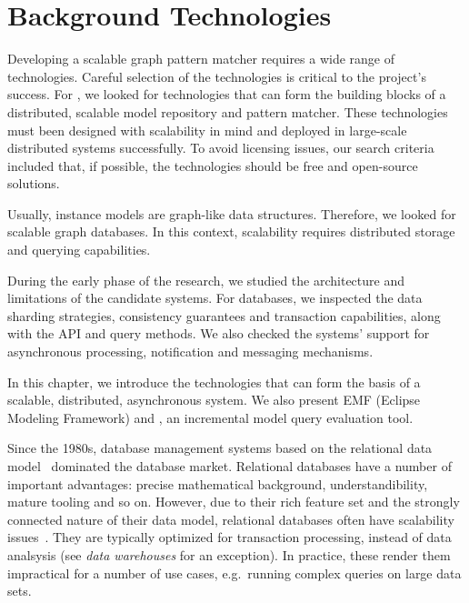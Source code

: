 \chapter{Background Technologies}
\label{chap:background-technologies}

Developing a scalable graph pattern matcher requires a wide range of technologies. Careful selection of the technologies is critical to the project's success. For \iqd{}, we looked for technologies that can form the building blocks of a distributed, scalable model repository and pattern matcher. These technologies must been designed with scalability in mind and deployed in large-scale distributed systems successfully. To avoid licensing issues, our search criteria included that, if possible, the technologies should be free and open-source solutions.

Usually, instance models are graph-like data structures. Therefore, we looked for scalable graph databases. In this context, scalability requires distributed storage and querying capabilities.

During the early phase of the research, we studied the architecture and limitations of the candidate systems. For databases, we inspected the data sharding strategies, consistency guarantees and transaction capabilities, along with the API and query methods. We also checked the systems' support for asynchronous processing, notification and messaging mechanisms.
 
In this chapter, we introduce the technologies that can form the basis of a scalable, distributed, asynchronous system. We also present EMF (Eclipse Modeling Framework) and \eiq{}, an incremental model query evaluation tool.



Since the 1980s, database management systems based on the relational data model~\cite{Codd:1970:RMD:362384.362685} dominated the database market. Relational databases have a number of important advantages: precise mathematical background, understandibility, mature tooling and so on. However, due to their rich feature set and the strongly connected nature of their data model, relational databases often have scalability issues~\cite{Jacobs:2009:PBD:1536616.1536632, Sakr13}. They are typically optimized for transaction processing, instead of data analsysis (see \emph{data warehouses} for an exception). In practice, these render them impractical for a number of use cases, e.g.\ running complex queries on large data sets.

